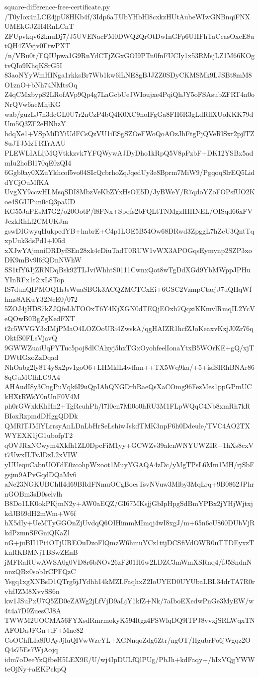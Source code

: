 \documentclass[11pt]{article}
\theoremstyle{definition}
\theoremstyle{remark}
\begin{document}
\begin{filecontents*}[overwrite]{square-difference-free-certificate.py}
/T0yIox4nLCE4jpU8HKb4f/3Idp6aTUbYHbHl8cxkzHUtAubeWIwGNBnqiFNXUMEkGJZH4RnLCnT
ZFUpvkqv62knuDj7/J5UVENacFM0DWQ2QrOtDwInGFp6UHFhTaCcasOxeE8utQH4ZVvjv0FtwPXT
/n/VBu0t/FQIUpwa1G9RnYdCTjZGxGOI9PTn0fnFUCIy1x53RMsjLZ1M66KOgtvQIo9KhqKSrG5I
83aoNYyWmHINga1rkksBr7Wb1kw6lLNE8gBJJZZ0SDyCKMSMk9LJSBt8mM8O1znO+bNh74NMtsOq
Z4qCMxbypS2LRofAVp9Qp4g7LaGcbUeJWIoujxe4PqiQhJY5oFSAsubZFRT4n0oNrQVw6aeMhjKG
wab/guzLJ7n3dcGL0U7r2nCzP4bQ4K0XC9noIFgGa8FH6R3gLdRflXUoKKK79dUm5Q3ZF2eHNhzY
hdqXe1+VSpMiDYiUdFCsQzVU1iESgSZOeFWoQoAOzJhFtgPjQVeRlSxr2pjlTZ8uJTJMzTRTrAAU
PLEWLIALljMQVtkkzvk7YFQWywAJDyDho1kRpQ5V8pPzbF+DK12YSBx5admIu2hoBl170qE0zQI4
6Ggb0ay0XZuYkhcof5vo04SIcQcbrhoZqJqedUy3e8Bprm7MiW9/PgqoqSlrEQ5LiddYCjOuMfKA
UvgXY9ccwHLMsqSDI8MbzVeKbZYxHsOE5D/JyBWeY/R7qdoYZoFOPsfUO2Koe4SGUPun0cQ3paUD
KG55JaPEsM7G2/o20OotP/l8FNx+Spqfs2bFQLtTNMgzIHHNEL/OISqd66xFVJczkRhLl2CMUKJm
gswDIGwyqHukpcdYB+lmbrE+C4p1LOE5B54Ow68DRwd3ZpggL7hZcU3QntTqxpUuk3dsPd1+l05d
xXJwYAjmniDRDyfSEn28xk4cDiuTadT0RUW1vWX3APOGqsEymynp2SZP3xoDK9mBv9l6fQDnNWhW
SS1tfY6JjZRNDqBsk92TLJviWhhtS0111CwnxQot8wTgDdXGd9YbMWppJPHuYInRFx1t2ixL8Top
IS7dunQIPMOQ1hJsWuaSBGk3ACQZMCTCxEi+6GSC2VzmpCtacjJ7uQHqWfhms8AKuY32NcE0/072
5ZOJ4jHDS7kZJQfeLhTOOxT6Y4KjXGN0dTEQjEOxh7QqziKKmvlRmqIL2YcVeQOwB0BgZgKedFXT
t2c5WVGY3xIMjPMaO4LOZOoURi4ZwskA/qgHAIZR1hcfZJoKeaxvKxjJ0Zr76qOktfS0FLsVjavQ
9GWWZuaiUqFYTuc5poj8dlCAlzyj5hxTGxOyohfeelIonaYtxB5WOrKE+gQ/xjTDWtIGxoZzDqad
NhOabg2ly8T4y8x2pv1goO6+LHMklL4wffnn++TX5Wq9ka/+5+isfSIRhBNAr868qGuMClhLG9A4
AHAudI8y3CngPuVqk6I9uQpIAhQNGDrhRaeQsXaCOmg96FezMes1ppGPmUCkHXtRWsY0nUnF0V4M
ph0rGWxkKhHn2+TgRcuhPh/l7I0cn7Mi0o0hRU3M1FLpWQqC4Nb8xmRh7kRBIoxRzpmdDHggQDDk
QMRlTJMlYLrrsyAnLDnLbHrSeLshiwJskdTMK3npF6h0Ddeule/TVC4AO2TXWYEXK1jG1ubofpT2
qOVJRxNCwym4Xkfh1ZL0DpcFiM1yy+GCWZv39alcnWNYUWZIR+1hXs8cxVt7UwxILTvJDzL2xVIW
yUUequCabnUOFdE0zcohpWxoot1MuyYGAQA4zDc/yMgTPsL6Mm1MH/rjSbFgsjm9APvGqdDQaMv6
aNc23NGKUBChlI4d69BRdFNmuOCgBoesTsvNVuw3Mlby3MqLrq+9B0862JPhrnGOBm3sD0selvlh
B8Do1LK0okPKjmN2y+AW0aEQZ/GI67MKsjjGbIpHpgSdBmYPBx2jYHjWjtxjkdJB69dH2mWm+W6f
hX5dIy+UeMTyGGOnZjUvdqQ6OIHimmMImqj4wI8xgJ/m+65n6cU860DUbVjRkdPzmnSFGniQKaZl
nG+juBII1Pi4OTjUREOuDzoFlQmzW6hmuYCz1ttjDCSfiVdOWR0uTTDEyxzTknRKBMNjTBSwZEnB
jMFRaRUwAWSA0g0VD8r6bNOv26zF201H6w2LDZC3mWmXSRnq4/fJ5SndnNnnzQBx0sobIrCPFQzC
Ysgq1xgXNBsD1QTrg5jJYdhh14kMZLFaqhxZ2IoUYED0UYUbaLBL34drTA7R0rvhfJZM8XvvSS6n
kw1JSuPxU7Q5ZD0eZAWg2jLfVjD9aLjY1kfZ+Nk/7aIboEXedwPnGe3MyEW/w4t4a7D9ZuesCJ8A
TWWM2UOCMA56FYXsdRmrmokyK594ltgz4FSWlqDQ9lTPJ8vvxjSRLWqxTNAFODaJFGn+lF+Mnc82
CoOChfLIa8fUAyJjluQIVwWzeYL+XGNnqoZdg6Ztr/ngOT/HgubrPo6jWgqz2OQ4s75Es7WjAojq
idm7oDeeYzQfbeH5LEX9E/U/wj4IpDULfQlPUg/PbJh+kdFaqy+/hIxVQgYWWteOjNy+aEKPckpQ

\end{filecontents*}
\end{document}
